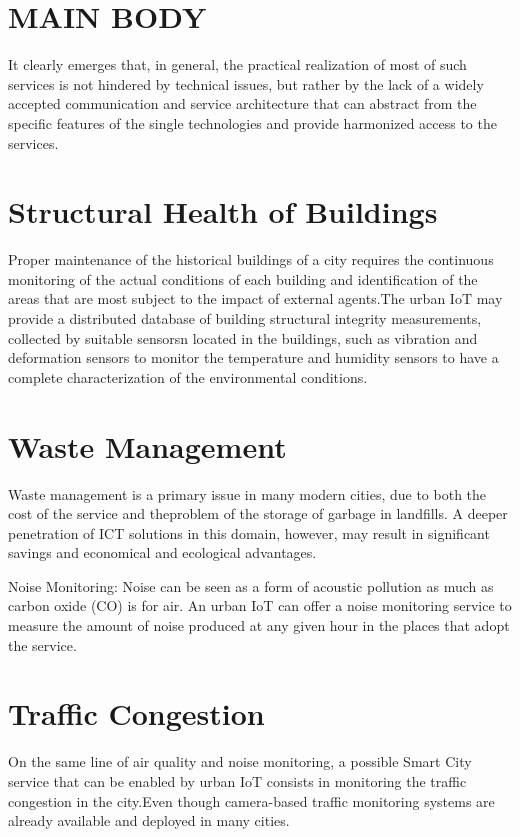 \documentclass[conference]{IEEEtran}
\begin{document}
	
	
	
	
	
	\section{MAIN BODY}
	It clearly emerges that, in general, the practical realization of most of such services is not hindered by technical issues, but rather by the lack of a widely accepted communication and service
	architecture that can abstract from the specific features of the single technologies and provide harmonized access to the services.
	
	
	
	
	\section{Structural Health of Buildings}
	Proper maintenance of the historical buildings of a city requires the continuous monitoring of the actual conditions of each building and identification of
	the areas that are most subject to the impact of external agents.The urban IoT may provide a distributed database of building structural integrity measurements, collected by suitable sensorsn located in the buildings, such as vibration and deformation  sensors to monitor the temperature and humidity sensors to have a complete characterization of the environmental conditions.
	
	
	
	
	\section{Waste Management}
	Waste management is a primary issue in many modern cities, due to both the cost of the service and theproblem of the storage of garbage in landfills. A deeper penetration of ICT solutions in this domain, however, may result in significant savings and economical and ecological advantages.
	
	Noise Monitoring: 
	Noise can be seen as a form of acoustic pollution as much as carbon oxide (CO) is for air. An urban IoT can offer a noise monitoring service to measure the amount of noise produced at any given hour in the places that adopt the service.
	
	
	
	
	\vfill\null
	
	
	\section{Traffic Congestion}
	On the same line of air quality and noise monitoring, a possible Smart City service that can be enabled by urban IoT consists in monitoring the traffic congestion in the city.Even though camera-based traffic monitoring systems are already available and deployed in many cities.
	
\end{document}
